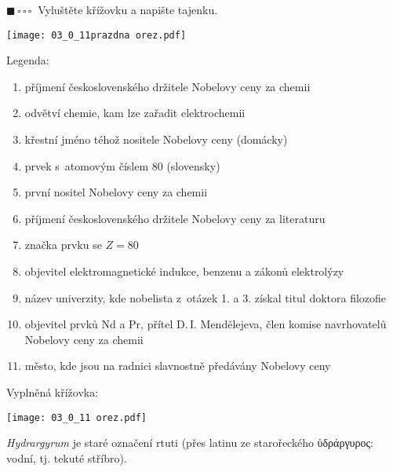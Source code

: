 \documentclass{book}
\newcommand{\jeden}{$\blacksquare \, \square \, \square \, \square \; \; $}
\renewenvironment{quotation}{\par}{\par} %
\begin{document}
\newpage %
\jeden Vyluštěte křížovku a napište tajenku.
\begin{center}
\texttt{[image: 03\_0\_11prazdna orez.pdf]}
\end{center}
\begin{quotation}
Legenda:
\begin{enumerate}[topsep=0mm,itemsep=0mm]
\item příjmení československého držitele Nobelovy ceny za chemii
\item odvětví chemie, kam lze zařadit elektrochemii
\item křestní jméno téhož nositele Nobelovy ceny (domácky)
\item prvek s~atomovým číslem 80 (slovensky)
\item první nositel Nobelovy ceny za chemii
\item příjmení československého držitele Nobelovy ceny za literaturu
\item značka prvku se $Z = 80$
\item objevitel elektromagnetické indukce, benzenu a zákonů elektrolýzy
\item název univerzity, kde nobelista z~otázek 1. a 3. získal titul doktora
filozofie
\item objevitel prvků Nd a Pr, přítel D.\,I. Mendělejeva, člen komise navrhovatelů
Nobelovy ceny za chemii
\item město, kde jsou na radnici slavnostně předávány Nobelovy ceny
\end{enumerate}
\end{quotation} \dotfill \par 
Vyplněná křížovka:
\begin{center}
\texttt{[image: 03\_0\_11 orez.pdf]}
\end{center}

\textit{Hydrargyrum} je staré označení rtuti (přes latinu ze starořeckého \foreignlanguage{greek}{ὑδράργυρος}:
vodní, tj. tekuté stříbro).
\end{document}
